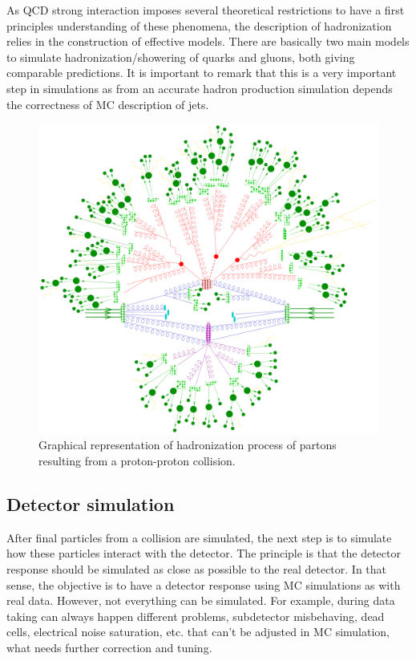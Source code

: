 As QCD strong interaction imposes several theoretical restrictions to have a first principles understanding of these phenomena, the description of hadronization relies in the construction of effective models. There are basically two main models to simulate hadronization/showering of quarks and gluons, both giving comparable predictions. It is important to remark that this is a very important step in simulations as from an accurate hadron production simulation depends the correctness of MC description of jets.

\begin{figure}[!Hhtbp]
  \begin{center}
    \includegraphics[width=\textwidth]{figs/parton_shower.png}
    \caption{Graphical representation of hadronization process of partons resulting from a proton-proton collision.}
    \label{fig:Hadr}
  \end{center}
\end{figure}

\subsection{Detector simulation}
\label{sec:detector}

After final particles from a collision are simulated, the next step is to simulate how these particles interact with the detector. The principle is that the detector response should be simulated as close as possible to the real detector. In that sense, the objective is to have a detector response using MC simulations as with real data. However, not everything can be simulated. For example, during data taking can always happen different problems, subdetector misbehaving, dead cells, electrical noise saturation, etc. that can't be adjusted in MC simulation, what needs further correction and tuning. 

